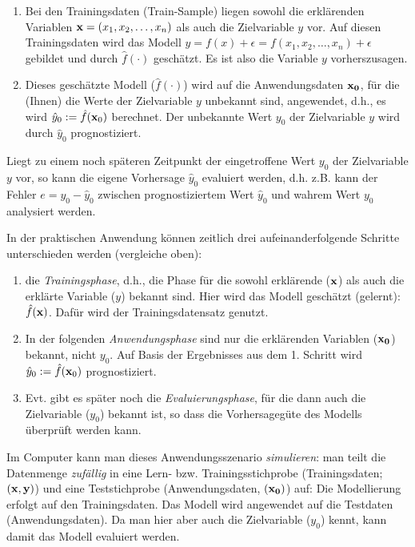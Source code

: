 \documentclass[
]{book}
\begin{document}
\begin{enumerate}
\def\labelenumi{\arabic{enumi}.}
\item
  Bei den Trainingsdaten (Train-Sample) liegen sowohl die erklärenden Variablen \({\bf{x}} = (x_1, x_2, \ldots, x_n)\) als auch die Zielvariable \(y\) vor.
  Auf diesen Trainingsdaten wird das Modell \(y=f({x})+\epsilon = f(x_1, x_2, \ldots, x_n)+\epsilon\) gebildet und durch \(\hat{f}(\cdot)\) geschätzt. Es ist also die Variable \(y\) vorherszusagen.
\item
  Dieses geschätzte Modell (\(\hat{f}(\cdot)\)) wird auf die Anwendungsdaten \(\bf{x}_0\), für die (Ihnen) die Werte der Zielvariable \(y\) unbekannt sind, angewendet, d.h., es wird \(\hat{y}_0 :=\hat{f}({\bf{x}}_0)\) berechnet.
  Der unbekannte Wert \(y_0\) der Zielvariable \(y\) wird durch \(\hat{y}_0\) prognostiziert.
\end{enumerate}

Liegt zu einem noch späteren Zeitpunkt der eingetroffene Wert \(y_0\) der Zielvariable \(y\) vor, so kann die eigene Vorhersage \(\hat{y}_0\) evaluiert werden,
d.h. z.B. kann der Fehler \(e=y_0-\hat{y}_0\) zwischen prognostiziertem Wert \(\hat{y}_0\) und wahrem Wert \(y_0\) analysiert werden.

In der praktischen Anwendung können zeitlich drei aufeinanderfolgende Schritte unterschieden werden (vergleiche oben):

\begin{enumerate}
\def\labelenumi{\arabic{enumi}.}
\item
  die \emph{Trainingsphase}, d.h., die Phase für die sowohl erklärende (\({\bf{x}}\)) als auch die erklärte Variable (\(y\)) bekannt sind. Hier wird das Modell geschätzt (gelernt): \(\hat{f}(\bf{x})\). Dafür wird der Trainingsdatensatz genutzt.
\item
  In der folgenden \emph{Anwendungsphase} sind nur die erklärenden Variablen (\({\bf{x_0}}\)) bekannt, nicht \(y_0\). Auf Basis der Ergebnisses aus dem 1. Schritt wird \(\hat{y}_0 :=\hat{f}({\bf{x}}_0)\) prognostiziert.
\item
  Evt. gibt es später noch die \emph{Evaluierungsphase}, für die dann auch die Zielvariable (\(y_0\)) bekannt ist, so dass die Vorhersagegüte des Modells überprüft werden kann.
\end{enumerate}

Im Computer kann man dieses Anwendungsszenario \emph{simulieren}:
man teilt die Datenmenge \emph{zufällig} in eine Lern- bzw. Trainingsstichprobe (Trainingsdaten; \((\bf{x},y)\)) und eine Teststichprobe (Anwendungsdaten, \((\bf{x_0})\)) auf:
Die Modellierung erfolgt auf den Trainingsdaten.
Das Modell wird angewendet auf die Testdaten (Anwendungsdaten).
Da man hier aber auch die Zielvariable (\(y_0\)) kennt, kann damit das Modell evaluiert werden.
\end{document}
